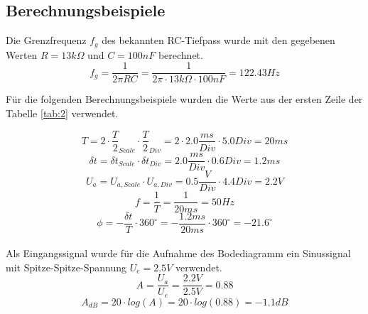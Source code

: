 \documentclass[12pt,a4paper,ngerman]{article}
\begin{document}
\subsection{Berechnungsbeispiele}
Die Grenzfrequenz $f_g$ des bekannten RC-Tiefpass wurde mit den gegebenen Werten $R = 13k\Omega$ und $C = 100 nF$ berechnet.
\begin{equation}
f_g = \frac{1}{2 \pi RC} = \frac{1}{2 \pi \cdot 13k\Omega \cdot 100nF} = 122.43Hz
\end{equation}

Für die folgenden Berechnungsbeispiele wurden die Werte aus der ersten Zeile der Tabelle \ref{tab:2} verwendet.

\begin{equation}
T = 2 \cdot \frac{T}{2}_{Scale} \cdot \frac{T}{2}_{Div} = 2 \cdot 2.0\frac{ms}{Div} \cdot 5.0 Div = 20ms
\end{equation}
\begin{equation}
\delta t = \delta t_{Scale} \cdot \delta t_{Div} = 2.0\frac{ms}{Div} \cdot 0.6Div = 1.2ms
\end{equation}
\begin{equation}
U_a = U_{a,Scale} \cdot U_{a,Div} = 0.5\frac{V}{Div} \cdot 4.4Div = 2.2V
\end{equation}
\begin{equation}
f = \frac{1}{T} = \frac{1}{20ms} = 50Hz
\end{equation}
\begin{equation}
\phi = - \frac{\delta t}{T} \cdot 360^\circ = -\frac{1.2ms}{20ms	} \cdot 360^\circ = -21.6^\circ
\end{equation}\\
Als Eingangssignal wurde für die Aufnahme des Bodediagramm ein Sinussignal mit Spitze-Spitze-Spannung $U_e = 2.5V$ verwendet.
\begin{equation}
A = \frac{U_a}{U_e} = \frac{2.2V}{2.5V} = 0.88
\end{equation}
\begin{equation}
A_{dB} = 20 \cdot log(A) = 20 \cdot log(0.88) = -1.1 dB
\end{equation}
\end{document}
